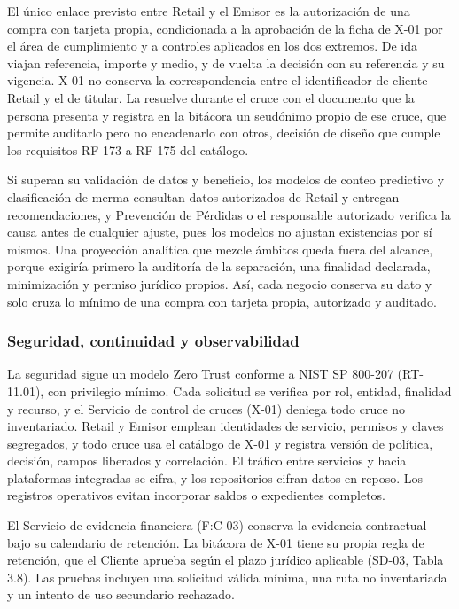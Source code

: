 \documentclass[11pt]{article}
\begin{document}
El único enlace previsto entre Retail y el Emisor es la autorización de una compra con tarjeta propia, condicionada a la aprobación de la ficha de X-01 por el área de cumplimiento y a controles aplicados en los dos extremos. De ida viajan referencia, importe y medio, y de vuelta la decisión con su referencia y su vigencia. X-01 no conserva la correspondencia entre el identificador de cliente Retail y el de titular. La resuelve durante el cruce con el documento que la persona presenta y registra en la bitácora un seudónimo propio de ese cruce, que permite auditarlo pero no encadenarlo con otros, decisión de diseño que cumple los requisitos RF-173 a RF-175 del catálogo.

Si superan su validación de datos y beneficio, los modelos de conteo predictivo y clasificación de merma consultan datos autorizados de Retail y entregan recomendaciones, y Prevención de Pérdidas o el responsable autorizado verifica la causa antes de cualquier ajuste, pues los modelos no ajustan existencias por sí mismos. Una proyección analítica que mezcle ámbitos queda fuera del alcance, porque exigiría primero la auditoría de la separación, una finalidad declarada, minimización y permiso jurídico propios. Así, cada negocio conserva su dato y solo cruza lo mínimo de una compra con tarjeta propia, autorizado y auditado.

\subsubsection{Seguridad, continuidad y observabilidad}

La seguridad sigue un modelo Zero Trust conforme a NIST SP 800-207 (RT-11.01), con privilegio mínimo. Cada solicitud se verifica por rol, entidad, finalidad y recurso, y el Servicio de control de cruces (X-01) deniega todo cruce no inventariado. Retail y Emisor emplean identidades de servicio, permisos y claves segregados, y todo cruce usa el catálogo de X-01 y registra versión de política, decisión, campos liberados y correlación. El tráfico entre servicios y hacia plataformas integradas se cifra, y los repositorios cifran datos en reposo. Los registros operativos evitan incorporar saldos o expedientes completos.

El Servicio de evidencia financiera (F:C-03) conserva la evidencia contractual bajo su calendario de retención. La bitácora de X-01 tiene su propia regla de retención, que el Cliente aprueba según el plazo jurídico aplicable (SD-03, Tabla 3.8). Las pruebas incluyen una solicitud válida mínima, una ruta no inventariada y un intento de uso secundario rechazado.
\end{document}
